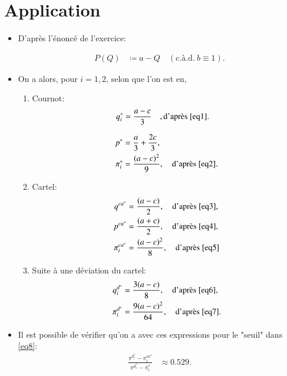 \documentclass[notes, ignorenonframetext, compress, 9pt, xcolor=svgnames, aspectratio=169]{beamer}
\begin{document}
\section{Application}
\frame{\sectionpage}
\begin{frame}
[allowframebreaks]{\insertsection}
\begin{itemize}
    \item D'après l'énoncé de l'exercice:
    
    \begin{align*}
    P(Q) &\coloneqq a - Q \quad (\text{c.à.d.} \ b\equiv 1).
    \end{align*}
    \item On a alors, pour $i=1, 2$, selon que l'on est en,
    \begin{enumerate}[$\cdot$]
    
    \item Cournot:
    \begin{align*}
    q_i ^* &= \frac{a-c}{3} \quad, \text{d'après} \ \eqref{eq1}.
    \end{align*}
    
    \begin{align*}
    p^{*} &= \frac{a}{3} +\frac{2c}{3},\\
    \pi_i ^* &= \frac{(a-c)^2}{9}, \quad \text{d'après} \ \eqref{eq2}.
    \end{align*}
    \item Cartel:
     \begin{align*}
    q^{ca^*} &= \frac{(a-c)}{2}, \quad \text{d'après} \ \eqref{eq3},\\
     p^{ca^*} &= \frac{(a+c)}{2}, \quad \text{d'après} \ \eqref{eq4},\\
     \pi_i ^{ca^*} &= \frac{(a-c)^2}{8}, \quad \text{d'après} \ \eqref{eq5}
        \end{align*}
        \item Suite à une déviation du cartel:
        \begin{align*}
        q_i^{d^*} &= \frac{3(a-c)}{8}, \quad \text{d'après} \ \eqref{eq6},\\
        \pi_i^{d^*} &= \frac{9(a-c)^2}{64}, \quad \text{d'après} \ \eqref{eq7}.\\
        \end{align*}
    \end{enumerate}
    \item Il est possible de vérifier qu'on a avec ces expressions pour le "seuil" dans \eqref{eq8}:
    \begin{align*}
    \frac{\pi^{d^*_i} - \pi_i^{ca^*} }{\pi^{d^*_i}  - \pi_i^*}&\approx 0.529.
    \end{align*}
\end{itemize}
\end{frame}
\end{document}
